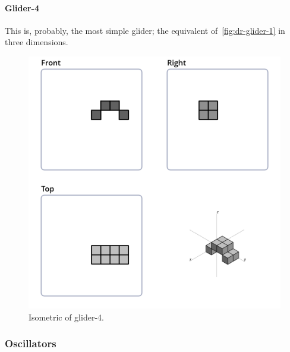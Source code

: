 \paragraph{Glider-4}
This is, probably, the most simple glider; the equivalent
of~\ref{fig:dr-glider-1} in three dimensions.
\begin{figure}
  \centering
  \includegraphics[scale=0.3]{iso_settings/glider_4.png}
  \caption{Isometric of glider-4.}
  \label{fig:iso-glider-4}
\end{figure}


\subsubsection{Oscillators}

